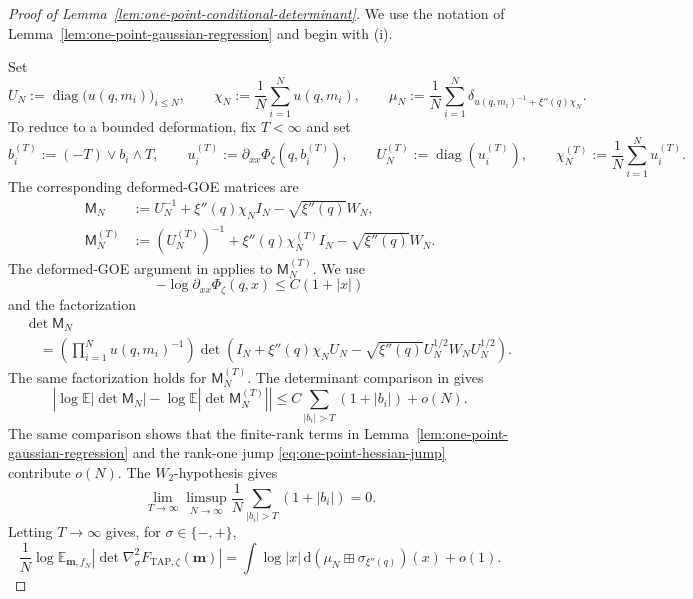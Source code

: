 \documentclass[a4paper,10pt,reqno]{amsart}
\numberwithin{equation}{section}
\newcommand{\dE}{\mathbb{E}}%
\newcommand{\dd}{\mathrm{d}}
\newcommand{\TAP}{\mathrm{TAP}}
\newcommand{\bfm}{\mathbf{m}}
\begin{document}
	\begin{proof}[Proof of Lemma~\ref{lem:one-point-conditional-determinant}]
		We use the notation of Lemma~\ref{lem:one-point-gaussian-regression}
		and begin with \textup{(i)}.
		
		Set
		\[
		U_N:=\operatorname{diag}\bigl(u(q,m_i)\bigr)_{i\le N},
		\qquad
		\chi_N:=\frac1N\sum_{i=1}^Nu(q,m_i),
		\qquad
		\mu_N:=\frac1N\sum_{i=1}^N
		\delta_{u(q,m_i)^{-1}+\xi''(q)\chi_N}.
		\]
		To reduce to a bounded deformation, fix \(T<\infty\) and set
		\[
		b_i^{(T)}:=(-T)\vee b_i\wedge T,
		\qquad
		u_i^{(T)}:=\partial_{xx}\Phi_\zeta(q,b_i^{(T)}),
		\qquad
		U_N^{(T)}:=\operatorname{diag}(u_i^{(T)}),
		\qquad
		\chi_N^{(T)}:=\frac1N\sum_{i=1}^Nu_i^{(T)}.
		\]
		The corresponding deformed-GOE matrices are
		\[
		\begin{aligned}
			\mathsf M_N
			&:=U_N^{-1}+\xi''(q)\chi_NI_N
			-\sqrt{\xi''(q)}W_N,\\
			\mathsf M_N^{(T)}
			&:=(U_N^{(T)})^{-1}+\xi''(q)\chi_N^{(T)}I_N
			-\sqrt{\xi''(q)}W_N.
		\end{aligned}
		\]
		The deformed-GOE argument in \cite[Proof of Lemma~C.4]{TAPIsing} applies to
		\(\mathsf M_N^{(T)}\). We use
		\[
		-\log\partial_{xx}\Phi_\zeta(q,x)\le C(1+|x|)
		\]
		and the factorization
		\[
		\begin{aligned}
			&\det\mathsf M_N\\
			&\quad=
			\left(\prod_{i=1}^Nu(q,m_i)^{-1}\right)
			\det\left(
			I_N+\xi''(q)\chi_NU_N
			-\sqrt{\xi''(q)}U_N^{1/2}W_NU_N^{1/2}
			\right).
		\end{aligned}
		\]
		The same factorization holds for \(\mathsf M_N^{(T)}\). The determinant
		comparison in \cite[Proof of Lemma~C.4]{TAPIsing} gives
		\[
		\left|
		\log\dE|\det\mathsf M_N|
		-
		\log\dE|\det\mathsf M_N^{(T)}|
		\right|
		\le
		C\sum_{\lvert b_i\rvert>T}(1+\lvert b_i\rvert)+o(N).
		\]
		The same comparison shows that the finite-rank terms
		in Lemma~\ref{lem:one-point-gaussian-regression} and the rank-one jump
		\eqref{eq:one-point-hessian-jump} contribute \(o(N)\).
		The \(W_2\)-hypothesis gives
		\[
		\lim_{T\to\infty}\limsup_{N\to\infty}
		\frac1N\sum_{\lvert b_i\rvert>T}(1+\lvert b_i\rvert)=0.
		\]
		Letting \(T\to\infty\) gives, for \(\sigma\in\{-,+\}\),
		\[
		\frac1N
		\log\dE_{\bfm,f_N}
		\left|\det\nabla_\sigma^2F_{\TAP,\zeta}(\bfm)\right|
		=
		\int\log|x|\,\dd
		\left(\mu_N\boxplus\sigma_{\xi''(q)}\right)(x)+o(1).
		\]
		

\end{proof}
\end{document}

